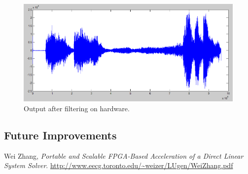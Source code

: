 \documentclass[]{article}
\begin{document}
\begin{figure}[p]
	\begin{center}
		\includegraphics[width = \textwidth]{Notch_filtered_from_hardware.PNG}
	\end{center}
	\caption{Output after filtering on hardware.}
	\label{fig:notch_output}
\end{figure}


\subsection{Future Improvements} %
\label{sub:future_improvements}





\clearpage

\begin{thebibliography}{9}
	Wei Zhang,
	\emph{Portable and Scalable FPGA-Based Acceleration of a Direct Linear System Solver}. \url{http://www.eecg.toronto.edu/~weizer/LUgen/WeiZhang.pdf}
\end{thebibliography}
\end{document}
